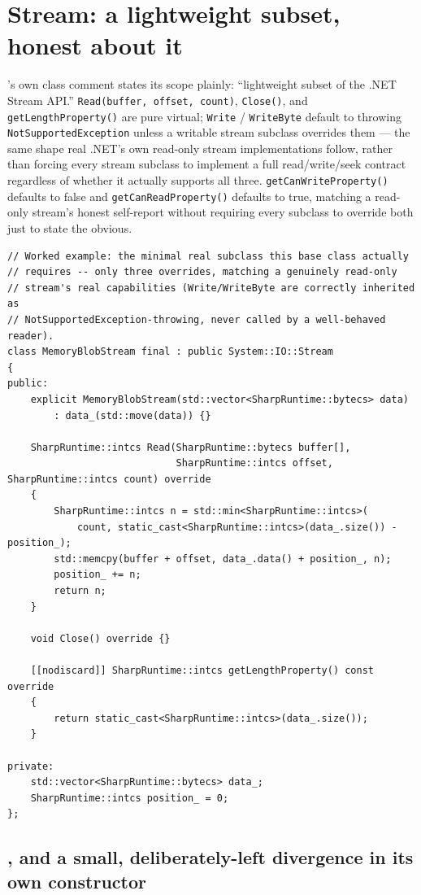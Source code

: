 \section{Stream: a lightweight subset, honest about it}

's own class comment states its scope plainly: ``lightweight subset of
the .NET Stream API.'' \texttt{Read(buffer, offset, count)}, \texttt{Close()}, and
\texttt{getLengthProperty()} are pure virtual; \texttt{Write} / \texttt{WriteByte} default to
throwing \texttt{NotSupportedException} unless a writable stream subclass overrides them ---
the same shape real .NET's own read-only stream implementations follow, rather than forcing
every stream subclass to implement a full read/write/seek contract regardless of whether it
actually supports all three. \texttt{getCanWriteProperty()} defaults to false and
\texttt{getCanReadProperty()} defaults to true, matching a read-only stream's honest self-report
without requiring every subclass to override both just to state the obvious.

\begin{lstlisting}
// Worked example: the minimal real subclass this base class actually
// requires -- only three overrides, matching a genuinely read-only
// stream's real capabilities (Write/WriteByte are correctly inherited as
// NotSupportedException-throwing, never called by a well-behaved reader).
class MemoryBlobStream final : public System::IO::Stream
{
public:
    explicit MemoryBlobStream(std::vector<SharpRuntime::bytecs> data)
        : data_(std::move(data)) {}

    SharpRuntime::intcs Read(SharpRuntime::bytecs buffer[],
                             SharpRuntime::intcs offset, SharpRuntime::intcs count) override
    {
        SharpRuntime::intcs n = std::min<SharpRuntime::intcs>(
            count, static_cast<SharpRuntime::intcs>(data_.size()) - position_);
        std::memcpy(buffer + offset, data_.data() + position_, n);
        position_ += n;
        return n;
    }

    void Close() override {}

    [[nodiscard]] SharpRuntime::intcs getLengthProperty() const override
    {
        return static_cast<SharpRuntime::intcs>(data_.size());
    }

private:
    std::vector<SharpRuntime::bytecs> data_;
    SharpRuntime::intcs position_ = 0;
};
\end{lstlisting}

\subsection{, and a small, deliberately-left divergence in its own constructor}

